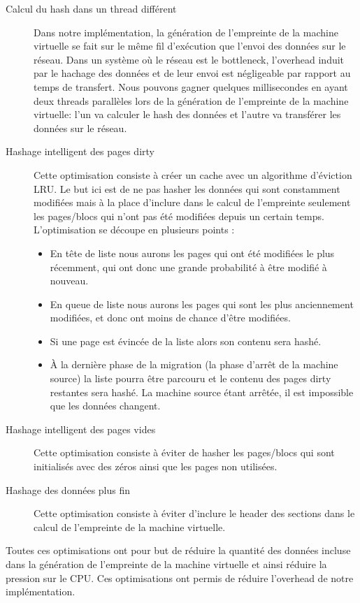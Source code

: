 \begin{description}
    \item[Calcul du hash dans un thread différent] Dans notre implémentation, la génération de l'empreinte de la machine virtuelle se fait sur le même fil d'exécution que l'envoi des données sur le réseau.
    Dans un système où le réseau est le bottleneck, l'overhead induit par le hachage des données et de leur envoi est négligeable par rapport au temps de transfert.    
    Nous pouvons gagner quelques millisecondes en ayant deux threads parallèles lors de la génération de l'empreinte de la machine virtuelle: l'un va calculer le hash des données et l'autre va transférer les données sur le réseau.
    \item[Hashage intelligent des pages dirty] Cette optimisation consiste à créer un cache avec un algorithme d'éviction LRU.
    Le but ici est de ne pas hasher les données qui sont constamment modifiées mais à la place d'inclure dans le calcul de l'empreinte seulement les pages/blocs qui n'ont pas été modifiées depuis un certain temps.
    L'optimisation se découpe en plusieurs points :
    \begin{itemize}
    \item En tête de liste nous aurons les pages qui ont été modifiées le plus récemment, qui ont donc une grande probabilité à être modifié à nouveau.
    \item En queue de liste nous aurons les pages qui sont les plus anciennement modifiées, et donc ont moins de chance d'être modifiées.
    \item Si une page est évincée de la liste alors son contenu sera hashé.
    \item À la dernière phase de la migration (la phase d'arrêt de la machine source) la liste pourra être parcouru et le contenu des pages dirty restantes sera hashé. 
    La machine source étant arrêtée, il est impossible que les données changent.
    \end{itemize}
    \item[Hashage intelligent des pages vides] Cette optimisation consiste à éviter de hasher les pages/blocs qui sont initialisés avec des zéros ainsi que les pages non utilisées.
    \item[Hashage des données plus fin] Cette optimisation consiste à éviter d'inclure le header des sections dans le calcul de l'empreinte de la machine virtuelle.
\end{description}
    Toutes ces optimisations ont pour but de réduire la quantité des données incluse dans la génération de l'empreinte de la machine virtuelle et ainsi réduire la pression sur le CPU. 
    Ces optimisations ont permis de réduire l'overhead de notre implémentation.
    